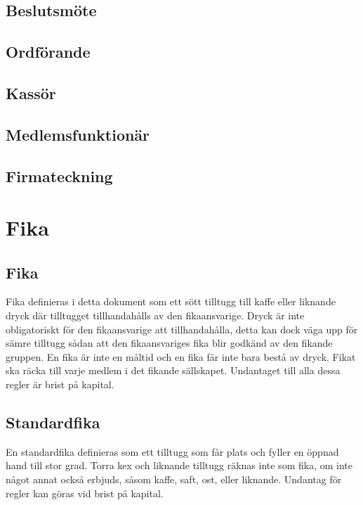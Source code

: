 \documentclass{article}
\begin{document}
\subsection{Beslutsmöte}

\subsection{Ordförande}

\subsection{Kassör}

\subsection{Medlemsfunktionär}

\subsection{Firmateckning}

\section{Fika} \label{fika}
\subsection{Fika} \label{fikafika} %
Fika definieras i detta dokument som ett sött tilltugg till kaffe eller liknande
dryck där tilltugget tillhandahålls av den fikaansvarige. Dryck är inte
obligatoriskt för den fikaansvarige att tillhandahålla, detta kan dock väga upp
för sämre tilltugg sådan att den fikaansvariges fika blir godkänd av den fikande
gruppen. En fika är inte en måltid och en fika får inte bara bestå av dryck.
Fikat ska räcka till varje medlem i det fikande sällskapet. Undantaget till alla
dessa regler är brist på kapital.

\subsection{Standardfika} \label{fikastandard} %
En standardfika definieras som ett tilltugg som får plats och fyller en öppnad
hand till stor grad. Torra kex och liknande tilltugg räknas inte som fika, om
inte något annat också erbjuds, såsom kaffe, saft, ost, eller liknande. Undantag
för regler kan göras vid brist på kapital.
\end{document}
